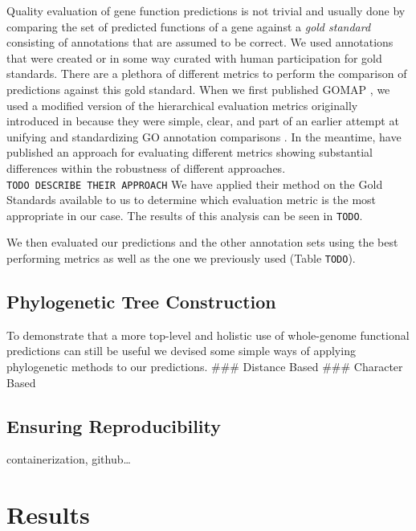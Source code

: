 \documentclass[utf8]{frontiersSCNS}
\begin{document}
Quality evaluation of gene function predictions is not trivial and usually done by comparing the set of predicted functions of a gene against a \emph{gold standard} consisting of annotations that are assumed to be correct.
We used annotations that were created or in some way curated with human participation for gold standards.
There are a plethora of different metrics to perform the comparison of predictions against this gold standard.
When we first published GOMAP \citep{Wimalanathan2018}, we used a modified version of the hierarchical evaluation metrics originally introduced in \citep{Verspoor2006} because they were simple, clear, and part of an earlier attempt at unifying and standardizing GO annotation comparisons \citep{Defoin-Platel2011}.
In the meantime, \citet{Plyusnin2018} have published an approach for evaluating different metrics showing substantial differences within the robustness of different approaches.
\texttt{TODO\ DESCRIBE\ THEIR\ APPROACH}
We have applied their method on the Gold Standards available to us to determine which evaluation metric is the most appropriate in our case.
The results of this analysis can be seen in \texttt{TODO}.

We then evaluated our predictions and the other annotation sets using the best performing metrics as well as the one we previously used (Table \texttt{TODO}).

\hypertarget{phylogenetic-tree-construction}{%
\subsection{Phylogenetic Tree Construction}\label{phylogenetic-tree-construction}}

To demonstrate that a more top-level and holistic use of whole-genome functional predictions can still be useful we devised some simple ways of applying phylogenetic methods to our predictions.
\#\#\# Distance Based
\#\#\# Character Based

\hypertarget{ensuring-reproducibility}{%
\subsection{Ensuring Reproducibility}\label{ensuring-reproducibility}}

containerization, github\ldots{}

\hypertarget{results}{%
\section{Results}\label{results}}
\end{document}

